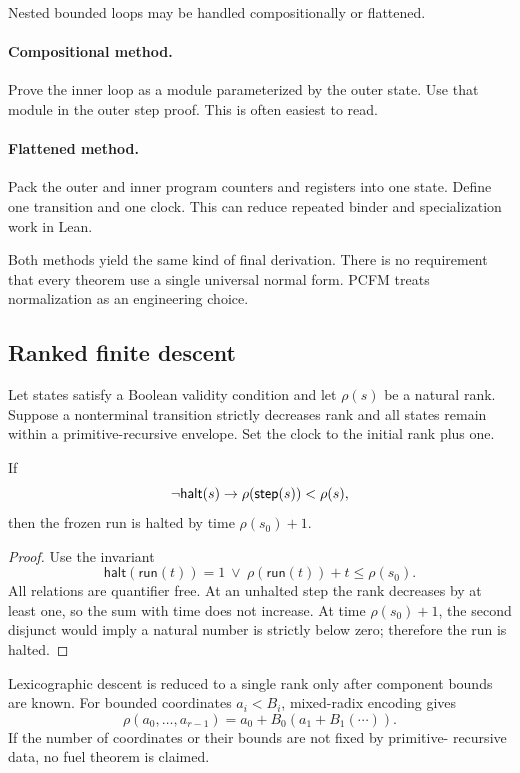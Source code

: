 Nested bounded loops may be handled compositionally or flattened.

\paragraph{Compositional method.}
Prove the inner loop as a module parameterized by the outer state.  Use that
module in the outer step proof.  This is often easiest to read.

\paragraph{Flattened method.}
Pack the outer and inner program counters and registers into one state.  Define
one transition and one clock.  This can reduce repeated binder and
specialization work in Lean.

Both methods yield the same kind of final derivation.  There is no requirement
that every theorem use a single universal normal form.  PCFM treats
normalization as an engineering choice.

\subsection{Ranked finite descent}

Let states satisfy a Boolean validity condition and let
\(\rho(s)\) be a natural rank.  Suppose a nonterminal transition strictly
decreases rank and all states remain within a primitive-recursive envelope.
Set the clock to the initial rank plus one.

\begin{theorem}
If
\[
  \neg\mathsf{halt}(s)\rightarrow
  \rho(\mathsf{step}(s))<\rho(s),
\]
then the frozen run is halted by time \(\rho(s_0)+1\).
\end{theorem}

\begin{proof}
Use the invariant
\[
  \mathsf{halt}(\mathsf{run}(t))=1
  \ \vee\
  \rho(\mathsf{run}(t))+t\le \rho(s_0).
\]
All relations are quantifier free.  At an unhalted step the rank decreases by
at least one, so the sum with time does not increase.  At time
\(\rho(s_0)+1\), the second disjunct would imply a natural number is strictly
below zero; therefore the run is halted.
\end{proof}

Lexicographic descent is reduced to a single rank only after component bounds
are known.  For bounded coordinates \(a_i<B_i\), mixed-radix encoding gives
\[
  \rho(a_0,\ldots,a_{r-1})
    = a_0+B_0(a_1+B_1(\cdots)).
\]
If the number of coordinates or their bounds are not fixed by primitive-
recursive data, no fuel theorem is claimed.

